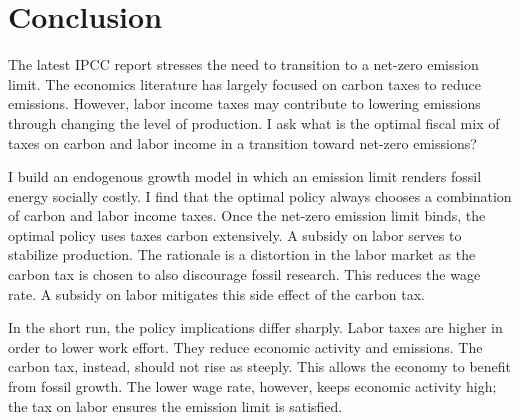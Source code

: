 \section{Conclusion}\label{sec:con}

The latest IPCC report \citep{IPCC2022} stresses the need to transition to a net-zero emission limit. The economics literature has largely focused on carbon taxes to reduce emissions. However, labor income taxes may contribute to lowering emissions through changing the level of production. I ask what is the optimal fiscal mix of taxes on carbon and labor income in a transition toward net-zero emissions?


 I build an endogenous growth model in which an emission limit renders fossil energy socially costly. I find that the optimal policy always chooses a combination of carbon and labor income taxes. Once the net-zero emission limit binds, the optimal policy uses taxes carbon extensively. A subsidy on labor serves to stabilize production.
 The rationale is a distortion in the labor market as the carbon tax is chosen to also discourage fossil research. This reduces the wage rate. A subsidy on labor mitigates this side effect of the carbon tax.
 
  In the short run, the policy implications differ sharply. Labor taxes are higher in order to lower work effort. They reduce economic activity and emissions. 
  The carbon tax, instead, should not rise as steeply. This allows the economy to benefit from fossil growth. The lower wage rate, however, keeps economic activity high; the tax on labor ensures the emission limit is satisfied. 
  
